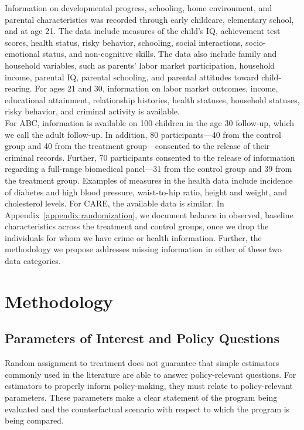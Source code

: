 

\noindent Information on developmental progress, schooling, home environment, and parental characteristics was recorded through early childcare, elementary school, and at age 21. The data include measures of the child's IQ, achievement test scores, health status, risky behavior, schooling, social interactions, socio-emotional status, and non-cognitive skills. The data also include family and household variables, such as parents' labor market participation, household income, parental IQ, parental schooling, and parental attitudes toward child-rearing. For ages 21 and 30, information on labor market outcomes, income, educational attainment, relationship histories, health statuses, household statuses, risky behavior, and criminal activity is available.\\

\noindent For ABC, information is available on 100 children in the age 30 follow-up, which we call the adult follow-up. In addition, 80 participants---40 from the control group and 40 from the treatment group---consented to the release of their criminal records. Further, 70 participants consented to the release of information regarding a full-range biomedical panel---31 from the control group and 39 from the treatment group. Examples of measures in the health data include incidence of diabetes and high blood pressure, waist-to-hip ratio, height and weight, and cholesterol levels. For CARE, the available data is similar. In Appendix~\ref{appendix:randomization}, we document balance in observed, baseline characteristics across the treatment and control groups, once we drop the individuals for whom we have crime or health information. Further, the methodology we propose addresses missing information in either of these two data categories.

\section{Methodology} \label{section:methodology}

\subsection{Parameters of Interest and Policy Questions} \label{section:methodsquestions}

\noindent Random assignment to treatment does not guarantee that simple estimators commonly used in the literature are able to answer policy-relevant questions. For estimators to properly inform policy-making, they must relate to policy-relevant parameters. These parameters make a clear statement of the program being evaluated and the counterfactual scenario with respect to which the program is being compared.\\

